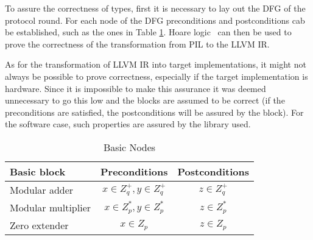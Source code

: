 To assure the correctness of types, first it is necessary to lay out
the DFG of the protocol round. For each node of the DFG preconditions
and postconditions cab be established, such as the ones in Table
\ref{tab:basic_nodes}. Hoare logic~\cite{hoare_logic} can then be
used to prove the correctness of the transformation from PIL to the
LLVM IR.

As for the transformation of LLVM IR into target implementations, it
might not always be possible to prove correctness, especially if the
target implementation is hardware. Since it is impossible to make this
assurance it was deemed unnecessary to go this low and the blocks are
assumed to be correct (if the preconditions are satisfied, the
postconditions will be assured by the block). For the software case,
such properties are assured by the library used.

\begin{table}[h!]
  \centering
  \begin{tabular}{l | c | c}
    Basic block        & Preconditions             & Postconditions \\
    \hline
    Modular adder      & $x \in Z_q^+, y \in Z_q^+$ & $z \in Z_q^+$ \\ 
    Modular multiplier & $x \in Z_p^*, y \in Z_p^*$ & $z \in Z_p^*$ \\
    Zero extender      & $x \in Z_p$               & $z \in Z_p$
  \end{tabular}
  \caption{Basic Nodes}
  \label{tab:basic_nodes}
\end{table}

